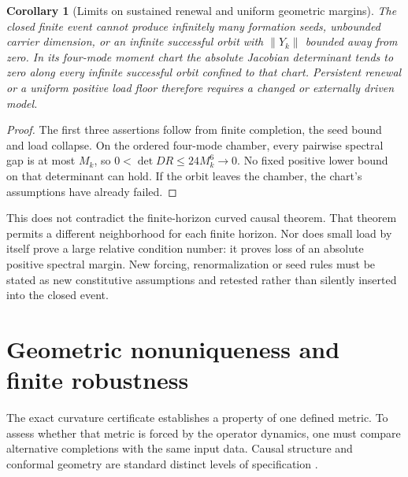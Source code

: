 \documentclass[11pt,letterpaper]{article}
\newtheorem{corollary}[theorem]{Corollary}
\theoremstyle{definition}
\numberwithin{equation}{section}
\begin{document}
\begin{corollary}[Limits on sustained renewal and uniform geometric margins]\label{renewallimit}
The closed finite event cannot produce infinitely many formation seeds, unbounded carrier dimension, or an infinite successful orbit with $\|Y_k\|$ bounded away from zero. In its four-mode moment chart the absolute Jacobian determinant tends to zero along every infinite successful orbit confined to that chart. Persistent renewal or a uniform positive load floor therefore requires a changed or externally driven model.
\end{corollary}
\begin{proof}
The first three assertions follow from finite completion, the seed bound and load collapse. On the ordered four-mode chamber, every pairwise spectral gap is at most $M_k$, so $0<\det DR\leq24M_k^6\to0$. No fixed positive lower bound on that determinant can hold. If the orbit leaves the chamber, the chart's assumptions have already failed.
\end{proof}
This does not contradict the finite-horizon curved causal theorem. That theorem permits a different neighborhood for each finite horizon. Nor does small load by itself prove a large relative condition number: it proves loss of an absolute positive spectral margin. New forcing, renormalization or seed rules must be stated as new constitutive assumptions and retested rather than silently inserted into the closed event.

\section{Geometric nonuniqueness and finite robustness}
The exact curvature certificate establishes a property of one defined metric. To assess whether that metric is forced by the operator dynamics, one must compare alternative completions with the same input data. Causal structure and conformal geometry are standard distinct levels of specification \cite{tonggr,minguzzi}.
\end{document}

